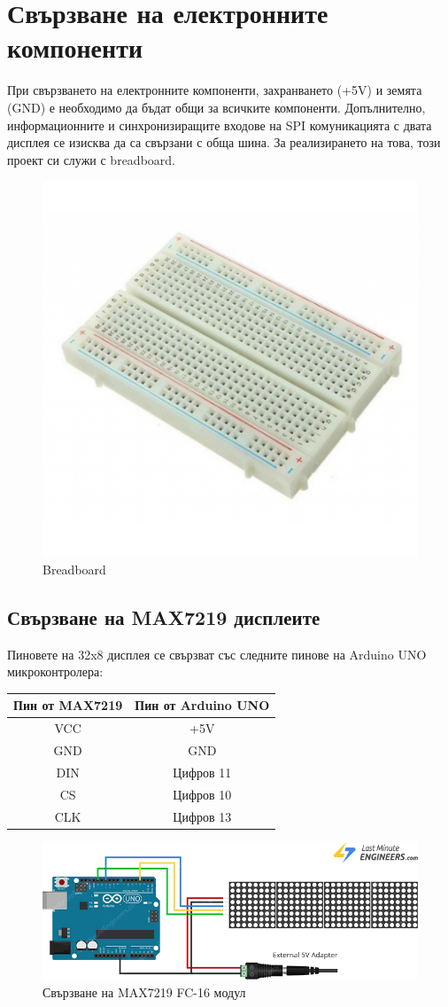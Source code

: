 \documentclass[titlepage, oneside, 14pt]{extbook}
\newcommand{\ard}{Arduino\texttrademark{}}
\begin{document}
\section{Свързване на електронните компоненти\label{wiring}}

При свързването на електронните компоненти, захранването (+5V) и земята (GND) е
необходимо да бъдат общи за всичките компоненти. Допълнително, информационните
и синхронизиращите входове на SPI комуникацията с двата дисплея се изисква да са
свързани с обща шина. За реализирането на това, този проект си служи с breadboard. \cite{breadboard}

\begin{figure}[!htbp]
    \centering
    \includegraphics[width=0.5\linewidth]{img/breadboard.png}
    \caption{Breadboard}
\end{figure}

\subsection{Свързване на MAX7219 дисплеите}

Пиновете на 32x8 дисплея се свързват със следните пинове на \ard{} UNO микроконтролера:

\begin{center}
  \begin{tabular}{c|c}
    Пин от MAX7219 & Пин от \ard{} UNO \\ 
    \hline
    VCC & +5V \\  
    GND & GND \\  
    DIN & Цифров 11 \\  
    CS & Цифров 10 \\  
    CLK & Цифров 13
  \end{tabular}
\end{center}

\begin{figure}[!htbp]
    \centering
    \includegraphics[width=0.5\linewidth]{img/display_wiring.png}
    \caption{Свързване на MAX7219 FC-16 модул}
\end{figure}
\end{document}
